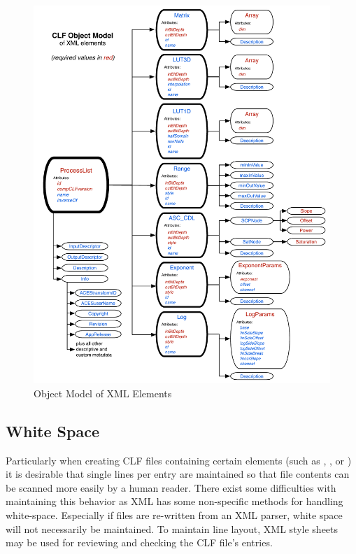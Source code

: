 \begin{figure}[htbp]
\begin{center}
    \includegraphics[width=\textwidth]{images/clf-diagram.pdf}
\caption{Object Model of XML Elements}
\label{fig:object-model}
\end{center}
\end{figure}

\subsection{White Space}
Particularly when creating CLF files containing certain elements (such as , , or ) it is desirable that single lines per entry are maintained so that file contents can be scanned more easily by a human reader. There exist some difficulties with maintaining this behavior as XML has some non-specific methods for handling white-space. Especially if files are re-written from an XML parser, white space will not necessarily be maintained. To maintain line layout, XML style sheets may be used for reviewing and checking the CLF file's entries.

